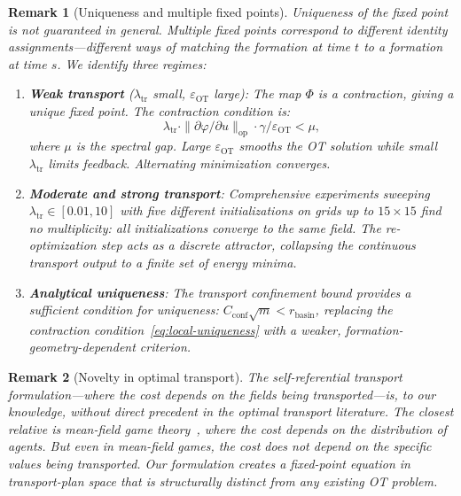 \documentclass[lettersize,journal]{IEEEtran}
\newtheorem{remark}{Remark}
\begin{document}
\begin{remark}[Uniqueness and multiple fixed points]
Uniqueness of the fixed point is \emph{not} guaranteed in general. Multiple fixed points correspond to different identity assignments---different ways of matching the formation at time $t$ to a formation at time $s$. We identify three regimes:

\begin{enumerate}
\item \textbf{Weak transport} ($\lambda_{\mathrm{tr}}$ small, $\varepsilon_{\mathrm{OT}}$ large): The map $\Phi$ is a contraction, giving a unique fixed point. The contraction condition is:
\begin{equation}
\label{eq:local-uniqueness}
\lambda_{\mathrm{tr}} \cdot \|\partial\varphi/\partial u\|_{\mathrm{op}} \cdot \gamma / \varepsilon_{\mathrm{OT}} < \mu,
\end{equation}
where $\mu$ is the spectral gap. Large $\varepsilon_{\mathrm{OT}}$ smooths the OT solution while small $\lambda_{\mathrm{tr}}$ limits feedback. Alternating minimization converges.

\item \textbf{Moderate and strong transport}: Comprehensive experiments sweeping $\lambda_{\mathrm{tr}} \in [0.01, 10]$ with five different initializations on grids up to $15 \times 15$ find \emph{no multiplicity}: all initializations converge to the same field. The re-optimization step acts as a discrete attractor, collapsing the continuous transport output to a finite set of energy minima.

\item \textbf{Analytical uniqueness}: The transport confinement bound provides a sufficient condition for uniqueness: $C_{\mathrm{conf}}\sqrt{m} < r_{\mathrm{basin}}$, replacing the contraction condition~\eqref{eq:local-uniqueness} with a weaker, formation-geometry-dependent criterion.
\end{enumerate}
\end{remark}

\begin{remark}[Novelty in optimal transport]
The self-referential transport formulation---where the cost depends on the fields being transported---is, to our knowledge, without direct precedent in the optimal transport literature. The closest relative is mean-field game theory~\cite{LasryLions2007}, where the cost depends on the \emph{distribution} of agents. But even in mean-field games, the cost does not depend on the \emph{specific values} being transported. Our formulation creates a fixed-point equation in transport-plan space that is structurally distinct from any existing OT problem.
\end{remark}
\end{document}
